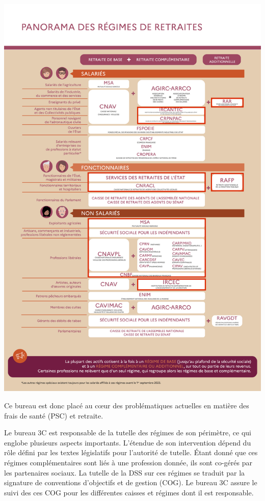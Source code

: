 \vspace{-0.5cm}
\begin{center}
	\includegraphics[scale=0.075, keepaspectratio]{figures/chap1/panorama_regimes_retraites.png}
\end{center}

\vspace{-0.5cm}

Ce bureau est donc placé au cœur des problématiques actuelles en matière des frais de santé (PSC) et retraite.

Le bureau 3C est responsable de la tutelle des régimes de son périmètre, ce qui englobe plusieurs aspects importants. L'étendue de son intervention dépend du rôle défini par les textes législatifs pour l'autorité de tutelle. Étant donné que ces régimes complémentaires sont liés à une profession donnée, ils sont co-gérés par les partenaires sociaux. La tutelle de la DSS sur ces régimes se traduit par la signature de conventions d’objectifs et de gestion (COG). Le bureau 3C assure le suivi des ces COG pour les différentes caisses et régimes dont il est responsable.

